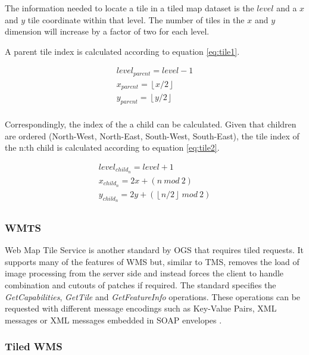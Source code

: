 The information needed to locate a tile in a tiled map dataset is the $level$ and a $x$ and $y$ tile coordinate within that level. The number of tiles in the $x$ and $y$ dimension will increase by a factor of two for each level.

A parent tile index is calculated according to equation \ref{eq:tile1}.

\begin{equation}
\label{eq:tile1}
\begin{split}
level_{parent} = level - 1 \\
x_{parent} = \left\lfloor x / 2 \right\rfloor \\
y_{parent} = \left\lfloor y / 2 \right\rfloor \\
\end{split}
\end{equation}

Correspondingly, the index of the a child can be calculated. Given that children are ordered (North-West, North-East, South-West, South-East), the tile index of the n:th child is calculated according to equation \ref{eq:tile2}.

\begin{equation}
\label{eq:tile2}
\begin{split}
level_{child_n} = level + 1 \\
x_{child_n} = 2 x + ( n ~ mod ~ 2 ) \\
y_{child_n} = 2 y + ( \left\lfloor n / 2 \right\rfloor ~ mod ~ 2 ) \\
\end{split}
\end{equation}



\subsubsection{WMTS}

Web Map Tile Service is another standard by OGS that requires tiled requests. It supports many of the features of WMS but, similar to TMS, removes the load of image processing from the server side and instead forces the client to handle combination and cutouts of patches if required. The standard specifies the \emph{GetCapabilities}, \emph{GetTile} and \emph{GetFeatureInfo} operations. These operations can be requested with different message encodings such as Key-Value Pairs, XML messages or XML messages embedded in SOAP envelopes \cite{wmts10}.

\subsubsection{Tiled WMS}


